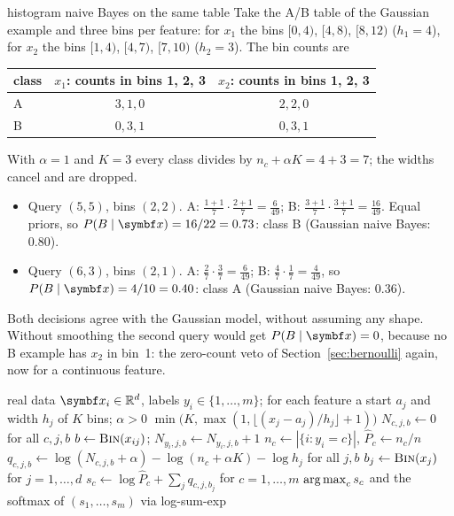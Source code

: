 \documentclass[11pt]{article}
\begin{document}
\begin{worked}{histogram naive Bayes on the same table}
Take the A/B table of the Gaussian example and three bins per feature: for $x_1$ the bins $[0, 4)$, $[4, 8)$, $[8, 12)$
($h_1 = 4$), for $x_2$ the bins $[1, 4)$, $[4, 7)$, $[7, 10)$ ($h_2 = 3$). The bin counts are
\begin{center}\small
\begin{tabular}{@{}lcc@{}}\toprule
class & $x_1$: counts in bins 1, 2, 3 & $x_2$: counts in bins 1, 2, 3 \\ \midrule
A & $3, 1, 0$ & $2, 2, 0$ \\
B & $0, 3, 1$ & $0, 3, 1$ \\ \bottomrule
\end{tabular}
\end{center}
With $\alpha = 1$ and $K = 3$ every class divides by $n_c + \alpha K = 4 + 3 = 7$; the widths cancel and are dropped.
\begin{itemize}
\item Query $(5, 5)$, bins $(2, 2)$. A: $\tfrac{1+1}{7} \cdot \tfrac{2+1}{7} = \tfrac{6}{49}$; B:
$\tfrac{3+1}{7} \cdot \tfrac{3+1}{7} = \tfrac{16}{49}$. Equal priors, so $P(B \mid \x) = 16/22 = 0.73$: class B
(Gaussian naive Bayes: $0.80$).
\item Query $(6, 3)$, bins $(2, 1)$. A: $\tfrac27 \cdot \tfrac37 = \tfrac{6}{49}$; B: $\tfrac47 \cdot \tfrac17 =
\tfrac{4}{49}$, so $P(B \mid \x) = 4/10 = 0.40$: class A (Gaussian naive Bayes: $0.36$).
\end{itemize}
Both decisions agree with the Gaussian model, without assuming any shape. Without smoothing the second query would
get $P(B \mid \x) = 0$, because no B example has $x_2$ in bin~1: the zero-count veto of Section~\ref{sec:bernoulli}
again, now for a continuous feature.
\end{worked}

\begin{algorithm}[H]
\caption{Histogram naive Bayes}\label{alg:hnb}
\footnotesize
\begin{algorithmic}[1]
\Require real data $\x_i \in \R^d$, labels $y_i \in \{1, \dots, m\}$; for each feature a start $a_j$ and width $h_j$ of $K$ bins; $\alpha > 0$
  \State \Return $\min\big(K, \max(1, \lfloor (x_j - a_j)/h_j \rfloor + 1)\big)$ 
\EndFunction
{}
  \State $N_{c,j,b} \gets 0$ for all $c, j, b$
    \State $b \gets \Call{Bin}{x_{ij}}$; \quad $N_{y_i, j, b} \gets N_{y_i, j, b} + 1$ 
  \EndFor
    \State $n_c \gets |\{i : y_i = c\}|$, \quad $\hat P_c \gets n_c/n$
    \State $q_{c,j,b} \gets \log(N_{c,j,b} + \alpha) - \log(n_c + \alpha K) - \log h_j$ for all $j, b$ 
  \EndFor
\EndFunction
{}
  \State $b_j \gets \Call{Bin}{x_j}$ for $j = 1, \dots, d$ 
  \State $s_c \gets \log \hat P_c + \sum_{j} q_{c,j,b_j}$ for $c = 1, \dots, m$
  \State \Return $\operatorname*{arg\,max}_c s_c$ and the softmax of $(s_1, \dots, s_m)$ via log-sum-exp
\EndFunction
\end{algorithmic}
\end{algorithm}
\end{document}
